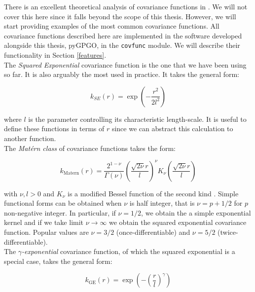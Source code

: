 \documentclass[10pt,a4paper,twoside]{book}
\begin{document}
There is an excellent theoretical analysis of covariance functions in \cite{Rasmussen2004}. We will not cover this here since it falls beyond the scope of this thesis. However, we will start providing examples of the most common covariance functions. All covariance functions described here are implemented in the software developed alongside this thesis, pyGPGO, in the \texttt{covfunc} module. We will describe their functionality in Section \ref{features}.\\

The \textit{Squared Exponential} covariance function is the one that we have been using so far. It is also arguably the most used in practice. It takes the general form:

\begin{equation}
k_{SE}(r) = \exp\left(-\dfrac{r^2}{2l^2} \right)
\end{equation}

where $l$ is the parameter controlling its characteristic length-scale. It is useful to define these functions in terms of $r$ since we can abstract this calculation to another function. \\

The \textit{Mat\'ern class} of covariance functions \cite{Minasny2005} takes the form:

\begin{equation}
k_{\textrm{Matern}}(r) = \dfrac{2^{1-\nu}}{\Gamma(\nu)}\left(\dfrac{\sqrt{2\nu} r}{l}    \right)^\nu K_\nu\left( \dfrac{\sqrt{2\nu}r}{l} \right)
\end{equation}

with $\nu, l > 0$ and $K_\nu$ is a modified Bessel function of the second kind \cite{Arfken2005}.  Simple functional forms can be obtained when $\nu$ is half integer, that is $\nu = p + 1/2$ for $p$ non-negative integer. In particular, if $\nu=1/2$, we obtain the a simple exponential kernel and if we take limit $\nu \rightarrow \infty$ we obtain the squared exponential covariance function. Popular values are $\nu=3/2$ (once-differentiable) and $\nu=5/2$ (twice-differentiable).\\


The $\gamma$\textit{-exponential} covariance function, of which the squared exponential is a special case, takes the general form:

\begin{equation}
k_{\mathrm{GE}}(r) = \exp\left( - \left(\dfrac{r}{l}\right)^\gamma  \right)
\end{equation}
\end{document}
